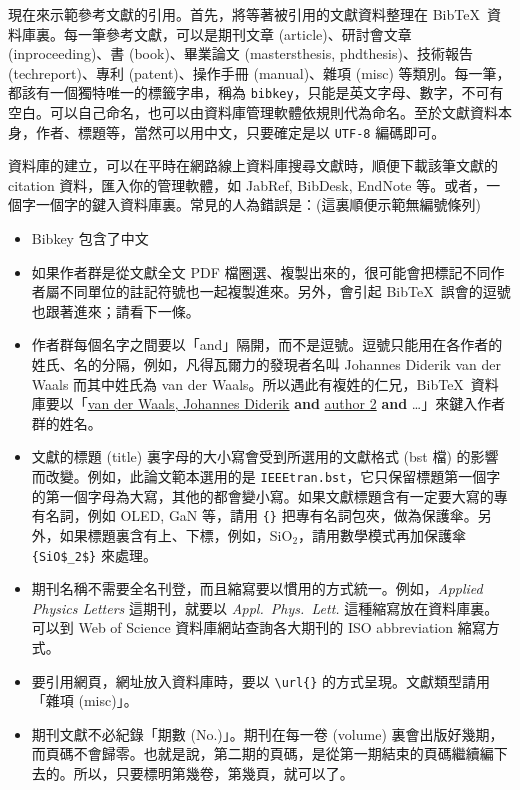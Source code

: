 現在來示範參考文獻的引用。首先，將等著被引用的文獻資料整理在 Bib\TeX\ 資料庫裏。每一筆參考文獻，可以是期刊文章 (article)、研討會文章 (inproceeding)、書 (book)、畢業論文 (mastersthesis, phdthesis)、技術報告 (techreport)、專利 (patent)、操作手冊 (manual)、雜項 (misc) 等類別。每一筆，都該有一個獨特唯一的標籤字串，稱為 \texttt{bibkey}，只能是英文字母、數字，不可有空白。可以自己命名，也可以由資料庫管理軟體依規則代為命名。至於文獻資料本身，作者、標題等，當然可以用中文，只要確定是以 \texttt{UTF-8} 編碼即可。

資料庫的建立，可以在平時在網路線上資料庫搜尋文獻時，順便下載該筆文獻的 citation 資料，匯入你的管理軟體，如 JabRef, BibDesk, EndNote 等。或者，一個字一個字的鍵入資料庫裏。常見的人為錯誤是：(這裏順便示範無編號條列)

\begin{itemize}
%
\item Bibkey 包含了中文

\item 如果作者群是從文獻全文 PDF 檔圈選、複製出來的，很可能會把標記不同作者屬不同單位的註記符號也一起複製進來。另外，會引起 Bib\TeX\ 誤會的逗號也跟著進來；請看下一條。

\item 作者群每個名字之間要以「and」隔開，而不是逗號。逗號只能用在各作者的姓氏、名的分隔，例如，凡得瓦爾力的發現者名叫 Johannes Diderik van der Waals 而其中姓氏為 van der Waals。所以遇此有複姓的仁兄，Bib\TeX\ 資料庫要以「\uline{van der Waals, Johannes Diderik} \textbf{and} \uline{author 2} \textbf{and} \ldots」來鍵入作者群的姓名。

\item 文獻的標題 (title) 裏字母的大小寫會受到所選用的文獻格式 (bst 檔) 的影響而改變。例如，此論文範本選用的是 \texttt{IEEEtran.bst}，它只保留標題第一個字的第一個字母為大寫，其他的都會變小寫。如果文獻標題含有一定要大寫的專有名詞，例如 OLED, GaN 等，請用 \verb+{}+ 把專有名詞包夾，做為保護傘。另外，如果標題裏含有上、下標，例如，SiO$_2$，請用數學模式再加保護傘 \verb+{SiO$_2$}+ 來處理。

\item 期刊名稱不需要全名刊登，而且縮寫要以慣用的方式統一。例如，\emph{Applied Physics Letters} 這期刊，就要以 \emph{Appl.\ Phys.\ Lett.} 這種縮寫放在資料庫裏。可以到 Web of Science 資料庫網站查詢各大期刊的 ISO abbreviation 縮寫方式\cite{url_journal_names}。

\item 要引用網頁，網址放入資料庫時，要以 \verb+\url{}+ 的方式呈現。文獻類型請用「雜項 (misc)」。

\item 期刊文獻不必紀錄「期數 (No.)」。期刊在每一卷 (volume) 裏會出版好幾期，而頁碼不會歸零。也就是說，第二期的頁碼，是從第一期結束的頁碼繼續編下去的。所以，只要標明第幾卷，第幾頁，就可以了。
\end{itemize}


